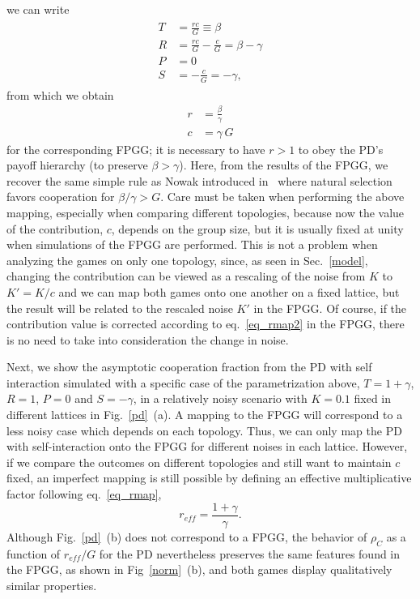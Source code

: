 \documentclass[5p,review]{elsarticle}
\begin{document}
we can write
%
\begin{align}
\begin{aligned}
T&=\frac{r c}{G} \equiv \beta \\
R&=\frac{r c}{G}-\frac{c}{G}=\beta-\gamma \\
P&=0 \\
S&=-\frac{c}{G}=-\gamma, 
\end{aligned}
\end{align}
%
from which we obtain  
\begin{align}
\label{eq_rmap}
    r &= \frac{\beta}{\gamma} \\
\label{eq_rmap2}
    c &= \gamma\, G
\end{align}
for the  corresponding FPGG; it is necessary to have $r>1$ to obey the PD's payoff hierarchy (to preserve $\beta>\gamma$). 
%
Here, from the results of the FPGG,  we recover the same simple rule as Nowak introduced in~\cite{ohtsuki2006simple} where natural selection favors cooperation for $\beta/\gamma>G$.
%
Care must be taken when performing the above mapping, especially when comparing different topologies,  because now the value of the contribution, $c$, depends on the group size, but it is usually fixed at unity when simulations of the FPGG are performed. This is not a problem when analyzing the games on only one topology, since,  as seen in Sec.~\ref{model}, changing the contribution can be viewed as a rescaling of the noise from $K$ to $K'=K/c$ and we can map both games onto one another on a fixed lattice, but the result will be related to the rescaled noise $K'$ in the FPGG.
%
Of course, if the contribution value is corrected according to  eq.~\ref{eq_rmap2} in the FPGG, there is no need to take into consideration the change in noise.

Next, we show the asymptotic cooperation fraction from the PD with self interaction simulated with a specific case of the parametrization above, $T = 1+\gamma$, $R = 1$, $P = 0$ and $S = - \gamma$, in a relatively noisy scenario with $K=0.1$ fixed in different lattices in  Fig.~\ref{pd}~(a). A mapping to the FPGG will correspond to a less noisy case which depends on each topology. 
%
Thus, we can only map the PD with self-interaction onto the FPGG for different noises in each lattice.
%
However, if we compare the outcomes on different topologies and still want to maintain $c$ fixed, an imperfect mapping is still possible by defining an effective multiplicative factor following eq.~\ref{eq_rmap},
%
\begin{equation}
    r_{eff} = \frac{1+\gamma}{\gamma}.
\end{equation}
%
Although Fig.~\ref{pd}~(b) does not correspond to a FPGG, the behavior of $\rho_C$ as a function of $r_{eff}/G$ for the PD  nevertheless preserves the same features found in the FPGG, as shown in Fig~\ref{norm}~(b),  and both games display qualitatively similar properties.
\end{document}
